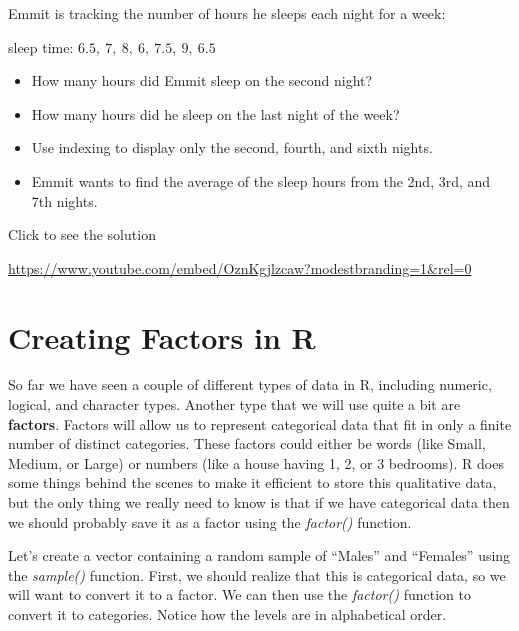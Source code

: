 \documentclass[
  letterpaper,
  DIV=11,
  numbers=noendperiod]{scrreprt}
\providecommand{\tightlist}{%
  \setlength{\itemsep}{0pt}\setlength{\parskip}{0pt}}
\begin{document}
\begin{tcolorbox}[enhanced jigsaw, leftrule=.75mm, arc=.35mm, coltitle=black, rightrule=.15mm, bottomrule=.15mm, toprule=.15mm, left=2mm, colbacktitle=quarto-callout-tip-color!10!white, title=\textcolor{quarto-callout-tip-color}{\faLightbulb}\hspace{0.5em}{Try it Out}, toptitle=1mm, breakable, colframe=quarto-callout-tip-color-frame, bottomtitle=1mm, titlerule=0mm, colback=white, opacityback=0, opacitybacktitle=0.6]

Emmit is tracking the number of hours he sleeps each night for a week:

sleep time: \(6.5,\ 7,\ 8,\ 6,\ 7.5,\ 9,\ 6.5\)

\begin{itemize}
\tightlist
\item
  How many hours did Emmit sleep on the second night?
\item
  How many hours did he sleep on the last night of the week?
\item
  Use indexing to display only the second, fourth, and sixth nights.
\item
  Emmit wants to find the average of the sleep hours from the 2nd, 3rd,
  and 7th nights.
\end{itemize}

Click to see the solution

\url{https://www.youtube.com/embed/OznKgjlzcaw?modestbranding=1&rel=0}

\end{tcolorbox}

\section{Creating Factors in R}\label{creating-factors-in-r}

So far we have seen a couple of different types of data in R, including
numeric, logical, and character types. Another type that we will use
quite a bit are \textbf{factors}. Factors will allow us to represent
categorical data that fit in only a finite number of distinct
categories. These factors could either be words (like Small, Medium, or
Large) or numbers (like a house having 1, 2, or 3 bedrooms). R does some
things behind the scenes to make it efficient to store this qualitative
data, but the only thing we really need to know is that if we have
categorical data then we should probably save it as a factor using the
\emph{factor()} function.

Let's create a vector containing a random sample of ``Males'' and
``Females'' using the \emph{sample()} function. First, we should realize
that this is categorical data, so we will want to convert it to a
factor. We can then use the \emph{factor()} function to convert it to
categories. Notice how the levels are in alphabetical order.
\end{document}
